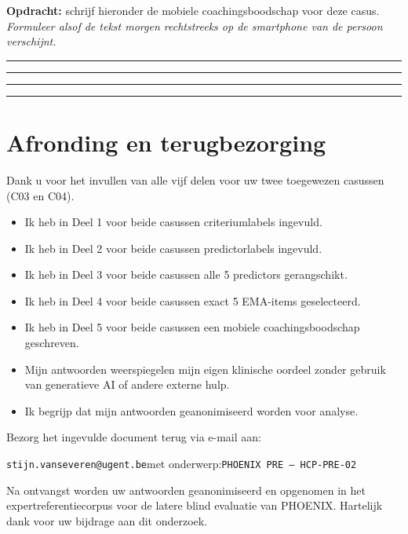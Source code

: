 \documentclass[11pt,a4paper]{article}
\newcommand{\writeline}{\vspace{0.22em}\noindent\rule{\linewidth}{0.25pt}\vspace{0.42em}\par}
\newcommand{\messagelines}{\writeline\writeline\writeline\writeline}
\begin{document}
\begin{responsebox}
\small\textbf{Opdracht:} schrijf hieronder de mobiele coachingsboodschap voor deze casus.
\textit{Formuleer alsof de tekst morgen rechtstreeks op de smartphone van de persoon verschijnt.}

\messagelines
\end{responsebox}

\vspace{0.6em}
\newpage


\section{Afronding en terugbezorging}

Dank u voor het invullen van alle vijf delen voor uw twee toegewezen casussen
(C03 en C04).

\begin{instrbox}[title=Checklist voor terugbezorging]
\begin{itemize}
\item[$\square$] Ik heb in Deel 1 voor beide casussen criteriumlabels ingevuld.
\item[$\square$] Ik heb in Deel 2 voor beide casussen predictorlabels ingevuld.
\item[$\square$] Ik heb in Deel 3 voor beide casussen alle 5 predictors gerangschikt.
\item[$\square$] Ik heb in Deel 4 voor beide casussen exact 5 EMA-items geselecteerd.
\item[$\square$] Ik heb in Deel 5 voor beide casussen een mobiele coachingsboodschap geschreven.
\item[$\square$] Mijn antwoorden weerspiegelen mijn eigen klinische oordeel zonder gebruik van generatieve AI of andere externe hulp.
\item[$\square$] Ik begrijp dat mijn antwoorden geanonimiseerd worden voor analyse.
\end{itemize}
\end{instrbox}

\medskip
Bezorg het ingevulde document terug via e-mail aan:
\begin{center}
\texttt{stijn.vanseveren@ugent.be}\quad met onderwerp:\quad \texttt{PHOENIX PRE --- HCP-PRE-02}
\end{center}

\vspace{0.5em}
\begin{tcolorbox}[colback=AccentBlue,colframe=PrimaryBlue,arc=2mm,boxrule=0.6pt,left=8pt,right=8pt,top=7pt,bottom=7pt]
\small\centering
Na ontvangst worden uw antwoorden geanonimiseerd en opgenomen in het expertreferentiecorpus
voor de latere blind evaluatie van PHOENIX. Hartelijk dank voor uw bijdrage aan dit onderzoek.
\end{tcolorbox}
\end{document}
